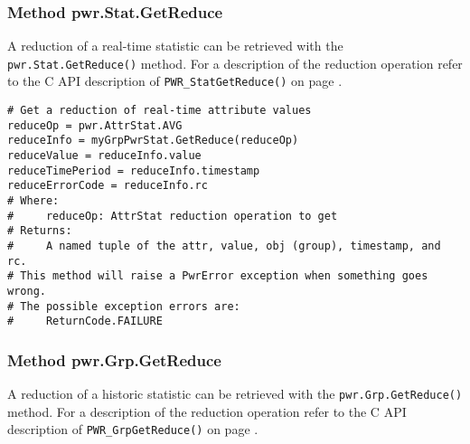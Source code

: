 \subsubsection{Method pwr.Stat.GetReduce} \label{meth:StatGetReduce}

A reduction of a real-time statistic can be retrieved with the
\texttt{pwr.Stat.GetReduce()} method. For a description of the reduction
operation refer to the C API description of \texttt{PWR_StatGetReduce()} on page
\pageref{func:StatGetReduce}.

\begin{center}\begin{minipage}{.95\linewidth}\begin{lstlisting}
# Get a reduction of real-time attribute values
reduceOp = pwr.AttrStat.AVG
reduceInfo = myGrpPwrStat.GetReduce(reduceOp)
reduceValue = reduceInfo.value
reduceTimePeriod = reduceInfo.timestamp
reduceErrorCode = reduceInfo.rc
# Where:
#     reduceOp: AttrStat reduction operation to get
# Returns:
#     A named tuple of the attr, value, obj (group), timestamp, and rc.
# This method will raise a PwrError exception when something goes wrong.
# The possible exception errors are:
#     ReturnCode.FAILURE
\end{lstlisting}\end{minipage}\end{center}

\subsubsection{Method pwr.Grp.GetReduce} \label{meth:GrpGetReduce}

A reduction of a historic statistic can be retrieved with the
\texttt{pwr.Grp.GetReduce()} method. For a description of the reduction
operation refer to the C API description of \texttt{PWR_GrpGetReduce()} on page
\pageref{func:GrpGetReduce}.

